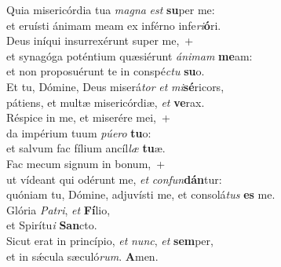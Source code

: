 \evenverse Quia misericórdia tua \textit{ma}\textit{gna} \textit{est} \textbf{su}per me:~\*\\
\evenverse et eruísti ánimam meam ex inférno infe\textit{ri}\textbf{ó}ri.\\
\oddverse Deus iníqui insurrexérunt super me,~+\\
\oddverse  et synagóga poténtium quæsiérunt \textit{á}\textit{ni}\textit{mam} \textbf{me}am:~\*\\
\oddverse et non proposuérunt te in conspé\textit{ctu} \textbf{su}o.\\
\evenverse Et tu, Dómine, Deus miserá\textit{tor} \textit{et} \textit{mi}\textbf{sé}ricors,~\*\\
\evenverse pátiens, et multæ misericórdiæ, \textit{et} \textbf{ve}rax.\\
\oddverse Réspice in me, et miserére mei,~+\\
\oddverse  da impérium tuum \textit{pú}\textit{e}\textit{ro} \textbf{tu}o:~\*\\
\oddverse et salvum fac fílium ancíl\textit{læ} \textbf{tu}æ.\\
\evenverse Fac mecum signum in bonum,~+\\
\evenverse  ut vídeant qui odérunt me, \textit{et} \textit{con}\textit{fun}\textbf{dán}tur:~\*\\
\evenverse quóniam tu, Dómine, adjuvísti me, et consolá\textit{tus} \textbf{es} me.\\
\oddverse Glória \textit{Pa}\textit{tri}, \textit{et} \textbf{Fí}lio,~\*\\
\oddverse et Spirítu\textit{i} \textbf{San}cto.\\
\evenverse Sicut erat in princípio, \textit{et} \textit{nunc}, \textit{et} \textbf{sem}per,~\*\\
\evenverse et in sǽcula sæculó\textit{rum}. \textbf{A}men.\\
